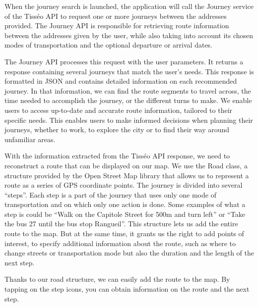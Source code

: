 When the journey search is launched, the application will call the Journey service of the Tisséo API to request one or more journeys between the addresses provided. The Journey API is responsible for retrieving route information between the addresses given by the user, while also taking into account its chosen modes of transportation and the optional departure or arrival dates.


The Journey API processes this request with the user parameters. It returns a response containing several journeys that match the user's needs. This response is formatted in JSON and contains detailed information on each recommended journey. In that information, we can find the route segments to travel across, the time needed to accomplish the journey, or the different turns to make. We enable users to access up-to-date and accurate route information, tailored to their specific needs. This enables users to make informed decisions when planning their journeys, whether to work, to explore the city or to find their way around unfamiliar areas.


With the information extracted from the Tisséo API response, we need to reconstruct a route that can be displayed on our map. We use the Road class, a structure provided by the Open Street Map library that allows us to represent a route as a series of GPS coordinate points. The journey is divided into several “steps”. Each step is a part of the journey that uses only one mode of transportation and on which only one action is done. Some examples of what a step is could be “Walk on the Capitole Street for 500m and turn left” or “Take the bus 27 until the bus stop Rangueil”. This structure lets us add the entire route to the map. But at the same time, it grants us the right to add points of interest, to specify additional information about the route, such as where to change streets or transportation mode but also the duration and the length of the next step.


Thanks to our road structure, we can easily add the route to the map. By tapping on the step icons, you can obtain information on the route and the next step.


